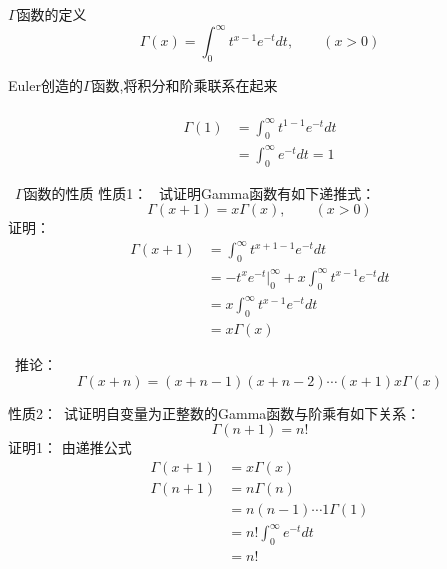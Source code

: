 	{$\Gamma$函数的定义}	
	\begin{equation*}
		\Gamma(x)=\int_{0}^{\infty} t^{x-1} e^{-t} dt, \qquad (x>0)
	\end{equation*}	
	
	Euler创造的$\Gamma$函数,将积分和阶乘联系在起来\\ \vspace{0.6em}
	{\例 [1.试证明]{ \[
		\Gamma(1)=1
	   \]}}
	{\证} ~	
\[ \begin{aligned}
	\Gamma(1)&=\int_{0}^{\infty} t^{1-1} e^{-t} dt \\	
			&=\int_{0}^{\infty}  e^{-t} dt =1	
\end{aligned}\]


	
	{~$\Gamma$函数的性质}
	{\alert{性质1：}} ~试证明Gamma函数有如下递推式：
		\[\Gamma(x+1)=x \Gamma(x),\qquad (x>0)\]
	{\alert{证明：} } 
	\begin{equation*}
	\begin{split}
		\Gamma(x+1)&= \int_{0}^{\infty} t^{x+1-1} e^{-t} dt \\
		&= -t^x e^{-t} |_0 ^\infty + x \int_{0}^{\infty} t^{x-1} e^{-t} dt \\
		&= x \int_{0}^{\infty} t^{x-1} e^{-t} dt \\
		&=x \Gamma(x)
	\end{split}
	\end{equation*}	



	 推论： 
	\begin{equation*}
		\Gamma(x+n)=(x+n-1)(x+n-2)\cdots (x+1)x\Gamma(x)
	\end{equation*}	 



	{\alert{性质2：}}~试证明自变量为正整数的Gamma函数与阶乘有如下关系：
	\begin{equation*}
		\Gamma(n+1)=n!
	\end{equation*}	
	{\alert{证明1：}}  由递推公式
	\begin{equation*}
	\begin{split}
		\Gamma(x+1)&=x \Gamma(x) \\
		\Gamma(n+1)&=n \Gamma(n) \\
		&=n(n-1)\cdots 1 \Gamma(1) \\
		&=n! \int_{0}^{\infty}  e^{-t} dt \\
		&=n!
	\end{split}
	\end{equation*}	



